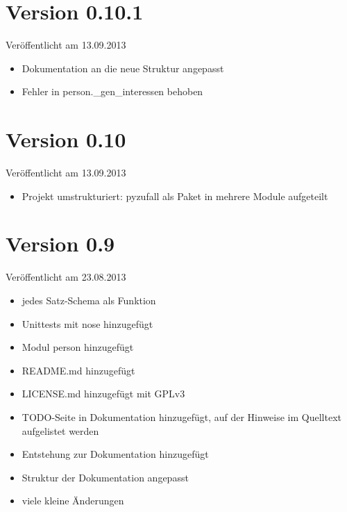 \documentclass[a4paper,12pt,oneside]{sphinxmanual}
\begin{document}
\section{Version 0.10.1}
\label{changelog:version-0-10-1}
Veröffentlicht am 13.09.2013
\begin{itemize}
\item {} 
Dokumentation an die neue Struktur angepasst

\item {} 
Fehler in person.\_gen\_interessen behoben

\end{itemize}


\section{Version 0.10}
\label{changelog:version-0-10}
Veröffentlicht am 13.09.2013
\begin{itemize}
\item {} 
Projekt umstrukturiert: pyzufall als Paket in mehrere Module aufgeteilt

\end{itemize}


\section{Version 0.9}
\label{changelog:version-0-9}
Veröffentlicht am 23.08.2013
\begin{itemize}
\item {} 
jedes Satz-Schema als Funktion

\item {} 
Unittests mit nose hinzugefügt

\item {} 
Modul person hinzugefügt

\item {} 
README.md hinzugefügt

\item {} 
LICENSE.md hinzugefügt mit GPLv3

\item {} 
TODO-Seite in Dokumentation hinzugefügt, auf der Hinweise im Quelltext aufgelistet werden

\item {} 
Entstehung zur Dokumentation hinzugefügt

\item {} 
Struktur der Dokumentation angepasst

\item {} 
viele kleine Änderungen

\end{itemize}
\end{document}
